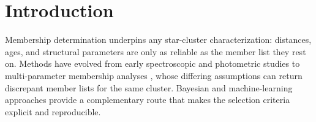 \documentclass{aa}
\begin{document}


   \maketitle

\medskip

\nolinenumbers

\section{Introduction}\label{S_intro}
Membership determination underpins any star-cluster characterization: distances, ages, and structural parameters are only as reliable as the member list they rest on. Methods have evolved from early spectroscopic and photometric studies \citep[e.g.,][]{1930LicOB..14..154T,1949ApJ...110..117S,1968ArA.....5....1L,1978MNRAS.182..607F} to multi-parameter membership analyses \citep{1989MNRAS.236..263P,1991MNRAS.249...76B,2005AA...438.1163K,2007AA...462..157P,2018AA...610A..30A}, whose differing assumptions can return discrepant member lists for the same cluster. Bayesian and machine-learning approaches provide a complementary route that makes the selection criteria explicit and reproducible.
\end{document}
